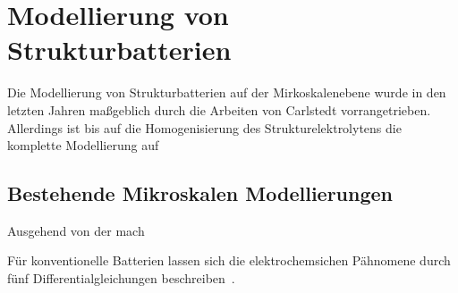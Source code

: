 \chapter{Modellierung von Strukturbatterien}
Die Modellierung von Strukturbatterien auf der Mirkoskalenebene wurde in den letzten Jahren maßgeblich durch die Arbeiten von Carlstedt vorrangetrieben. Allerdings ist bis auf die Homogenisierung des Strukturelektrolytens die komplette Modellierung auf 

\section{Bestehende Mikroskalen Modellierungen}
Ausgehend von der mach

Für konventionelle Batterien lassen sich die elektrochemsichen Pähnomene durch fünf Differentialgleichungen beschreiben~\cite{Plett2015}.

